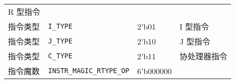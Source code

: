 \begin{longtable}[]{@{}llll@{}}
\begin{minipage}[t]{0.22\columnwidth}
R 型指令\strut
\end{minipage}\tabularnewline
\begin{minipage}[t]{0.22\columnwidth}\raggedright
指令类型\strut
\end{minipage} & \begin{minipage}[t]{0.22\columnwidth}\raggedright
\texttt{I\_TYPE}\strut
\end{minipage} & \begin{minipage}[t]{0.22\columnwidth}\raggedright
2'b01\strut
\end{minipage} & \begin{minipage}[t]{0.22\columnwidth}\raggedright
I 型指令\strut
\end{minipage}\tabularnewline
\begin{minipage}[t]{0.22\columnwidth}\raggedright
指令类型\strut
\end{minipage} & \begin{minipage}[t]{0.22\columnwidth}\raggedright
\texttt{J\_TYPE}\strut
\end{minipage} & \begin{minipage}[t]{0.22\columnwidth}\raggedright
2'b10\strut
\end{minipage} & \begin{minipage}[t]{0.22\columnwidth}\raggedright
J 型指令\strut
\end{minipage}\tabularnewline
\begin{minipage}[t]{0.22\columnwidth}\raggedright
指令类型\strut
\end{minipage} & \begin{minipage}[t]{0.22\columnwidth}\raggedright
\texttt{C\_TYPE}\strut
\end{minipage} & \begin{minipage}[t]{0.22\columnwidth}\raggedright
2'b11\strut
\end{minipage} & \begin{minipage}[t]{0.22\columnwidth}\raggedright
协处理器指令\strut
\end{minipage}\tabularnewline
\begin{minipage}[t]{0.22\columnwidth}\raggedright
指令魔数\strut
\end{minipage} & \begin{minipage}[t]{0.22\columnwidth}\raggedright
\texttt{INSTR\_MAGIC\_RTYPE\_OP}\strut
\end{minipage} & \begin{minipage}[t]{0.22\columnwidth}\raggedright
6'b000000\strut
\end{minipage} & \begin{minipage}[t]{0.22\columnwidth}\raggedright

\end{minipage}
\end{longtable}

